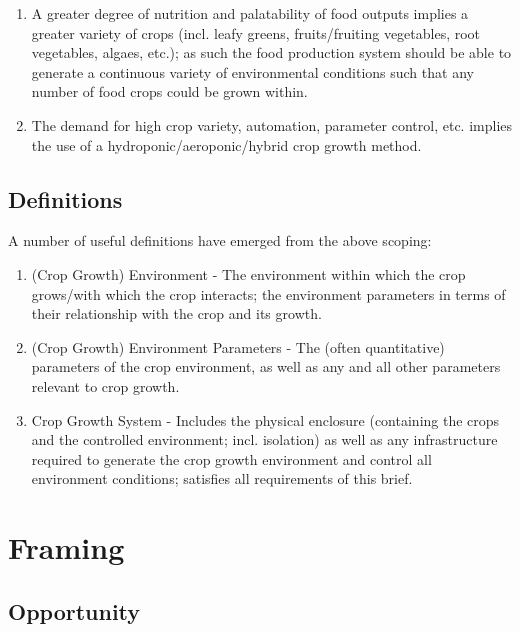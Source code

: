 \documentclass{report}
\begin{document}
\begin{enumerate}

\item A greater degree of nutrition and palatability of food outputs implies a greater 
    variety of crops (incl. leafy greens, fruits/fruiting vegetables, root vegetables, 
    algaes, etc.); as such the food production system should be able to generate a 
    continuous variety of environmental conditions such that any number of food crops 
    could be grown within.
\item The demand for high crop variety, automation, parameter control, etc. implies 
    the use of a hydroponic/aeroponic/hybrid crop growth method.
\end{enumerate}

\subsection{Definitions}
\label{sec:definitions}
A number of useful definitions have emerged from the above scoping:

\begin{enumerate}
\item (Crop Growth) Environment - The environment within which the crop grows/with which 
the crop interacts; the environment parameters in terms of their relationship with the 
crop and its growth.
\item (Crop Growth) Environment Parameters - The (often quantitative) parameters of the 
crop environment, as well as any and all other parameters relevant to crop growth.
\item Crop Growth System - Includes the physical enclosure (containing the crops and the 
controlled environment; incl. isolation) as well as any infrastructure required to 
generate the crop growth environment and control all environment conditions; satisfies 
all requirements of this brief.
\end{enumerate}

\newpage

\section{Framing}
\label{sec:framing}

\subsection{Opportunity}
\label{sec:opportunity}
\end{document}
